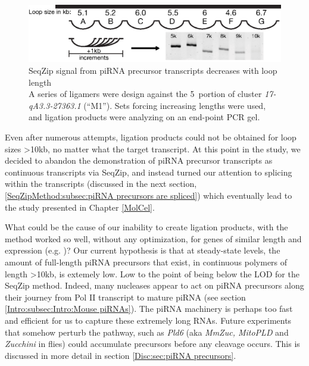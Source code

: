     \begin{figure} %
      \centering
      \includegraphics{Figures/SeqZipMethod/piRNAprecusorM1SignalDecreasesWithLoopLength.eps}
      \caption[SeqZip signal from piRNA precursor transcripts decreases with loop length]
      {
        SeqZip signal from piRNA precursor transcripts decreases with loop length\\[0.25cm]
        A series of ligamers were design against the 5\textprime~portion of cluster \textit{17-qA3.3-27363.1} (``M1''). Sets forcing increasing lengths were used, and ligation products were analyzing on an end-point PCR gel.
        }
      \label{SeqZipMethod:fig:piRNA precusors and loop length}
      \end{figure}

    Even after numerous attempts, ligation products could not be obtained for loop sizes >10kb, no matter what the target transcript. At this point in the study, we decided to abandon the demonstration of piRNA precursor transcripts as continuous transcripts via SeqZip, and instead turned our attention to splicing within the transcripts (discussed in the next section, \ref{SeqZipMethod:subsec:piRNA precursors are spliced}) which eventually lead to the study presented in Chapter \ref{MolCel}.

    What could be the cause of our inability to create ligation products, with the method worked so well, without any optimization, for genes of similar length and expression (e.g. \dst{})? Our current hypothesis is that at steady-state levels, the amount of full-length piRNA precursors that exist, in continuous polymers of length >10kb, is extemely low. Low to the point of being below the LOD for the SeqZip method. Indeed, many nucleases appear to act on piRNA precursors along their journey from Pol II transcript to mature piRNA (see section \ref{Intro:subsec:Intro:Mouse piRNAs}). The piRNA machinery is perhaps too fast and efficient for us to capture these extremely long RNAs. Future experiments that somehow perturb the pathway, such as \textit{Pld6} (aka \textit{MmZuc, MitoPLD} and \textit{Zucchini} in flies) could accumulate precursors before any cleavage occurs. This is discussed in more detail in section \ref{Disc:sec:piRNA precursors}.

